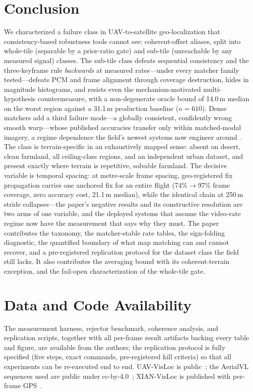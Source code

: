 \documentclass[journal]{IEEEtran}
\begin{document}
\section{Conclusion}

We characterized a failure class in UAV-to-satellite geo-localization that consistency-based robustness tools cannot see: coherent-offset aliases, split into whole-tile (separable by a prior-ratio gate) and sub-tile (unreachable by any measured signal) classes. The sub-tile class defeats sequential consistency and the three-keyframe rule \emph{backwards} at measured rates---under every matcher family tested---defeats PCM and frame alignment through coverage destruction, hides in magnitude histograms, and resists even the mechanism-motivated multi-hypothesis countermeasure, with a non-degenerate oracle bound of 14.0\,m median on the worst region against a 31.1\,m production baseline ($n=610$). Dense matchers add a third failure mode---a globally consistent, confidently wrong smooth warp---whose published accuracies transfer only within matched-modal imagery, a regime dependence the field's newest systems now engineer around~\cite{loretta,satroma}. The class is terrain-specific in an exhaustively mapped sense: absent on desert, clean farmland, all ceiling-class regions, and an independent urban dataset, and present exactly where terrain is repetitive, solvable farmland. The decisive variable is temporal spacing: at metre-scale frame spacing, geo-registered fix propagation carries one anchored fix for an entire flight (74\%$\to$97\% frame coverage, zero accuracy cost, 21.1\,m median), while the identical chain at 250\,m stride collapses---the paper's negative results and its constructive resolution are two arms of one variable, and the deployed systems that assume the video-rate regime now have the measurement that says why they must. The paper contributes the taxonomy, the matcher-stable rate tables, the sign-folding diagnostic, the quantified boundary of what map matching can and cannot recover, and a pre-registered replication protocol for the dataset class the field still lacks. It also contributes the averaging bound with its coherent-terrain exception, and the fail-open characterization of the whole-tile gate.

\section*{Data and Code Availability}
The measurement harness, rejector benchmark, coherence analysis, and replication scripts, together with all per-frame result artifacts backing every table and figure, are available from the authors; the replication protocol is fully specified (five steps, exact commands, pre-registered kill criteria) so that all experiments can be re-executed end to end. UAV-VisLoc is public~\cite{uavvisloc}; the AerialVL sequences used are public under cc-by-4.0~\cite{aerialvl}; XIAN-VisLoc is published with per-frame GPS~\cite{xianvisloc}.



\end{document}
